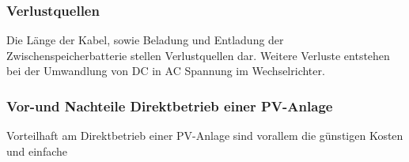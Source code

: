 \subsubsection{Verlustquellen}
Die Länge der Kabel, sowie Beladung und Entladung der Zwischenspeicherbatterie stellen Verlustquellen dar. Weitere Verluste entstehen bei der Umwandlung von DC in AC Spannung im Wechselrichter.

\subsubsection{Vor-und Nachteile Direktbetrieb einer PV-Anlage}
Vorteilhaft am Direktbetrieb einer PV-Anlage sind vorallem die günstigen Kosten und einfache 